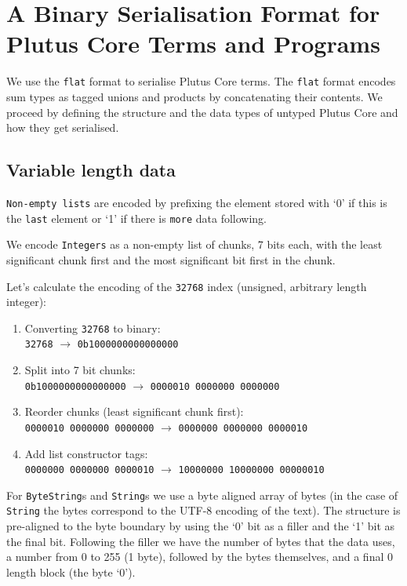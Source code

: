 \section{A Binary Serialisation Format for Plutus Core Terms and Programs}
\label{appendix:serialisation}

We use the \texttt{flat} \citep{flat} format to serialise Plutus Core terms. The
\texttt{flat} format encodes sum types as tagged unions and products by
concatenating their contents. We proceed by defining the structure and the data
types of untyped Plutus Core and how they get serialised.

\subsection{Variable length data}

\texttt{Non-empty lists} are encoded by prefixing the element stored with `0'
if this is the \texttt{last} element or `1' if there is \texttt{more} data following.

\noindent We encode \texttt{Integers} as a non-empty list of chunks, 7 bits each,
with the least significant chunk first and the most significant bit first in the chunk.

\medskip
\noindent Let's calculate the encoding of the \texttt{32768} index (unsigned, arbitrary
length integer):
\begin{enumerate}
  \item Converting \texttt{32768} to binary: \\
    \verb|32768| $\rightarrow$ \verb|0b1000000000000000|
  \item Split into 7 bit chunks: \\
    \verb|0b1000000000000000| $\rightarrow$ \verb|0000010 0000000 0000000|
  \item Reorder chunks (least significant chunk first): \\
    \verb|0000010 0000000 0000000| $\rightarrow$ \verb|0000000 0000000 0000010|
  \item Add list constructor tags: \\
    \verb|0000000 0000000 0000010| $\rightarrow$ \verb|10000000 10000000 00000010|
\end{enumerate}

For \texttt{ByteString}s and \texttt{String}s we use a byte aligned array of
bytes (in the case of \texttt{String} the bytes correspond to the UTF-8 encoding
of the text). The structure is pre-aligned to the byte boundary by using the `0'
bit as a filler and the `1' bit as the final bit. Following the filler we have
the number of bytes that the data uses, a number from 0 to 255 (1 byte),
followed by the bytes themselves, and a final 0 length block (the byte `0').

